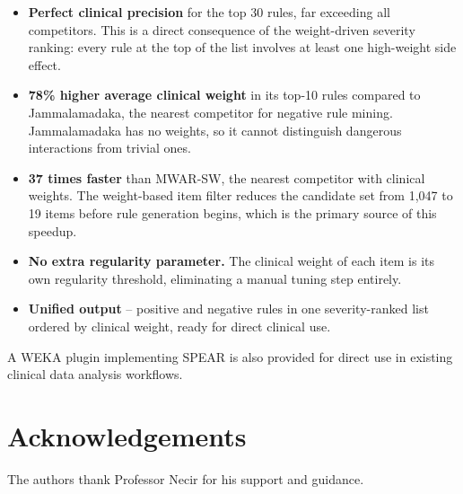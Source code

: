 \documentclass[10pt,twocolumn]{article}
\begin{document}
\begin{itemize}[leftmargin=*]
  \item \textbf{Perfect clinical precision} for the top 30 rules,
        far exceeding all competitors. This is a direct consequence
        of the weight-driven severity ranking: every rule at the top
        of the list involves at least one high-weight side effect.
  \item \textbf{78\% higher average clinical weight} in its top-10
        rules compared to Jammalamadaka, the nearest competitor for
        negative rule mining. Jammalamadaka has no weights, so it
        cannot distinguish dangerous interactions from trivial ones.
  \item \textbf{37 times faster} than MWAR-SW, the nearest competitor
        with clinical weights. The weight-based item filter reduces
        the candidate set from 1{,}047 to 19 items before rule
        generation begins, which is the primary source of this speedup.
  \item \textbf{No extra regularity parameter.} The clinical weight
        of each item is its own regularity threshold, eliminating
        a manual tuning step entirely.
  \item \textbf{Unified output} -- positive and negative rules in
        one severity-ranked list ordered by clinical weight, ready
        for direct clinical use.
\end{itemize}

A WEKA plugin implementing SPEAR is also provided for direct use
in existing clinical data analysis workflows.

\section*{Acknowledgements}
The authors thank Professor Necir for his support and guidance.
\end{document}

